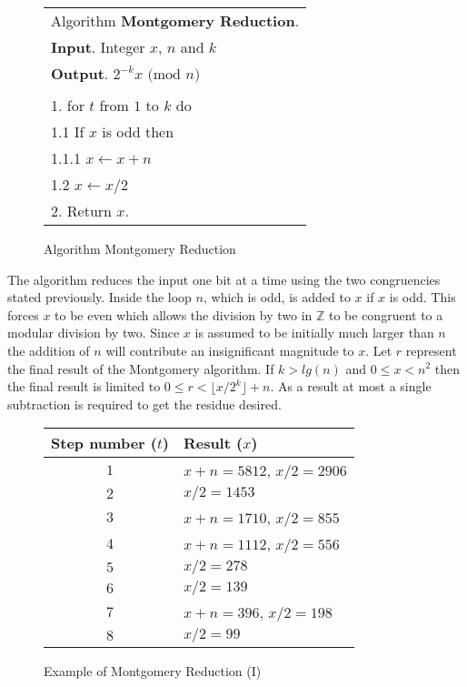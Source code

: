 \documentclass[b5paper]{book}
\def\Z{{\mathbb Z}}
\begin{document}
\newpage\begin{figure}[!here]
\begin{small}
\begin{center}
\begin{tabular}{l}
\hline Algorithm \textbf{Montgomery Reduction}. \\
\textbf{Input}.   Integer $x$, $n$ and $k$ \\
\textbf{Output}.  $2^{-k}x \mbox{ (mod }n\mbox{)}$ \\
\hline \\
1.  for $t$ from $1$ to $k$ do \\
\hspace{3mm}1.1  If $x$ is odd then \\
\hspace{6mm}1.1.1  $x \leftarrow x + n$ \\
\hspace{3mm}1.2  $x \leftarrow x/2$ \\
2.  Return $x$. \\
\hline
\end{tabular}
\end{center}
\end{small}
\caption{Algorithm Montgomery Reduction}
\end{figure}

The algorithm reduces the input one bit at a time using the two congruencies stated previously.  Inside the loop $n$, which is odd, is
added to $x$ if $x$ is odd.  This forces $x$ to be even which allows the division by two in $\Z$ to be congruent to a modular division by two.  Since
$x$ is assumed to be initially much larger than $n$ the addition of $n$ will contribute an insignificant magnitude to $x$.  Let $r$ represent the 
final result of the Montgomery algorithm.  If $k > lg(n)$ and $0 \le x < n^2$ then the final result is limited to 
$0 \le r < \lfloor x/2^k \rfloor + n$.  As a result at most a single subtraction is required to get the residue desired.

\begin{figure}[here]
\begin{small}
\begin{center}
\begin{tabular}{|c|l|}
\hline \textbf{Step number ($t$)} & \textbf{Result ($x$)} \\
\hline $1$ & $x + n = 5812$, $x/2 = 2906$ \\
\hline $2$ & $x/2 = 1453$ \\
\hline $3$ & $x + n = 1710$, $x/2 = 855$ \\
\hline $4$ & $x + n = 1112$, $x/2 = 556$ \\
\hline $5$ & $x/2 = 278$ \\
\hline $6$ & $x/2 = 139$ \\
\hline $7$ & $x + n = 396$, $x/2 = 198$ \\
\hline $8$ & $x/2 = 99$ \\
\hline
\end{tabular}
\end{center}
\end{small}
\caption{Example of Montgomery Reduction (I)}
\label{fig:MONT1}
\end{figure}
\end{document}
